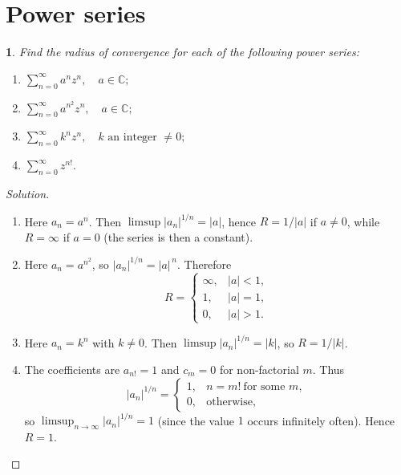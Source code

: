 \documentclass[12pt, a4paper]{report}
\theoremstyle{spaced}
\newtheorem{exercise}{}
\newcommand{\setexercise}[1]{\setcounter{exercise}{#1-1}}
\begin{document}
\section{Power series}

\setexercise{6}
\begin{exercise}
	Find the radius of convergence for each of the following power series:

	\begin{enumerate}[label=(\alph*)]
		\item $\displaystyle \sum_{n=0}^{\infty} a^n z^n, \quad a \in \mathbb{C};$
		\item $\displaystyle \sum_{n=0}^{\infty} a^{n^2} z^n, \quad a \in \mathbb{C};$
		\item $\displaystyle \sum_{n=0}^{\infty} k^n z^n, \quad k \text{ an integer } \neq 0;$
		\item $\displaystyle \sum_{n=0}^{\infty} z^{n!}.$
	\end{enumerate}

\end{exercise}

\begin{proof}[Solution]
	\begin{enumerate}[label=(\alph*), leftmargin=2em]
		\item Here $a_n=a^n$. Then $\limsup |a_n|^{1/n}=|a|$, hence $R=1/|a|$ if $a\neq 0$, while $R=\infty$ if $a=0$ (the series is then a constant).

		\item Here $a_n=a^{n^2}$, so $|a_n|^{1/n}=|a|^{\,n}$. Therefore
		      \[
			      R=\begin{cases}
				      \infty, & |a|<1, \\
				      1,      & |a|=1, \\
				      0,      & |a|>1.
			      \end{cases}
		      \]

		\item Here $a_n=k^n$ with $k\neq 0$. Then $\limsup |a_n|^{1/n}=|k|$, so $R=1/|k|$.

		\item The coefficients are $a_{n!}=1$ and $c_m=0$ for non-factorial $m$. Thus
		      \[
			      |a_n|^{1/n}=
			      \begin{cases}
				      1, & n=m!\ \text{for some }m, \\
				      0, & \text{otherwise},
			      \end{cases}
		      \]
		      so $\limsup_{n\to\infty} |a_n|^{1/n}=1$ (since the value $1$ occurs infinitely often). Hence $R=1$.
	\end{enumerate}
\end{proof}
\end{document}
